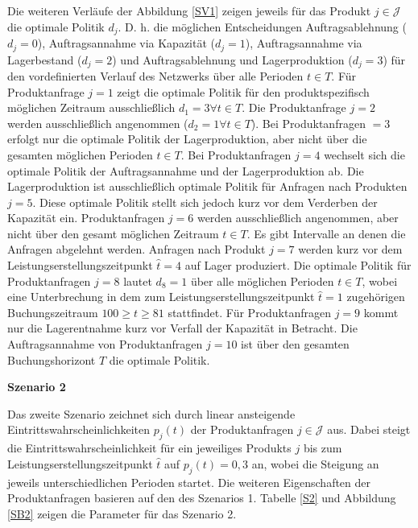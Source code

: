 Die weiteren Verläufe der Abbildung \ref{SV1} zeigen jeweils für das Produkt $j\in\mathcal{J}$ die optimale Politik $d_j$. D. h. die möglichen Entscheidungen \glqq Auftragsablehnung ($d_j=0$){\grqq}, \glqq Auftragsannahme via Kapazität ($d_j=1$){\grqq}, \glqq Auftragsannahme via Lagerbestand ($d_j=2$){\grqq} und \glqq Auftragsablehnung und Lagerproduktion ($d_j=3$){\grqq} für den vordefinierten Verlauf des Netzwerks über alle Perioden $t\in T$. Für Produktanfrage $j=1$ zeigt die optimale Politik für den produktspezifisch möglichen Zeitraum ausschließlich $d_1=3\forall t\in T$. Die Produktanfrage $j=2$ werden ausschließlich angenommen ($d_2=1\forall t \in T$). Bei Produktanfragen $=3$ erfolgt nur die optimale Politik der Lagerproduktion, aber nicht über die gesamten möglichen Perioden $t\in T$. Bei Produktanfragen $j=4$ wechselt sich die optimale Politik  der Auftragsannahme und der Lagerproduktion ab. Die Lagerproduktion ist ausschließlich optimale Politik für Anfragen nach Produkten $j=5$. Diese optimale Politik stellt sich jedoch kurz vor dem Verderben der Kapazität ein. Produktanfragen $j=6$ werden ausschließlich angenommen, aber nicht über den gesamt möglichen Zeitraum $t\in T$. Es gibt Intervalle an denen die Anfragen abgelehnt werden. Anfragen nach Produkt $j=7$ werden kurz vor dem Leistungserstellungszeitpunkt $\hat t=4$ auf Lager produziert. Die optimale Politik für Produktanfragen $j=8$ lautet $d_8=1$ über alle möglichen Perioden $t\in T$, wobei eine Unterbrechung in dem zum Leistungserstellungszeitpunkt $\hat t=1$ zugehörigen Buchungszeitraum $100\ge t \ge 81$ stattfindet. Für Produktanfragen $j=9$ kommt nur die Lagerentnahme kurz vor Verfall der Kapazität in Betracht. Die Auftragsannahme von Produktanfragen $j=10$ ist über den gesamten Buchungshorizont $T$ die optimale Politik.

\textbf{Szenario 2}

Das zweite Szenario zeichnet sich durch linear ansteigende Eintrittswahrscheinlichkeiten $p_j(t)$ der Produktanfragen $j\in\mathcal{J}$ aus. Dabei steigt die Eintrittswahrscheinlichkeit für ein jeweiliges Produkts $j$ bis zum Leistungserstellungszeitpunkt $\hat t$ auf $p_j(t)=0,3$ an, wobei die Steigung an jeweils unterschiedlichen Perioden startet. Die weiteren Eigenschaften der Produktanfragen basieren auf den des Szenarios 1. Tabelle \ref{S2} und Abbildung \ref{SB2} zeigen die Parameter für das Szenario 2.

